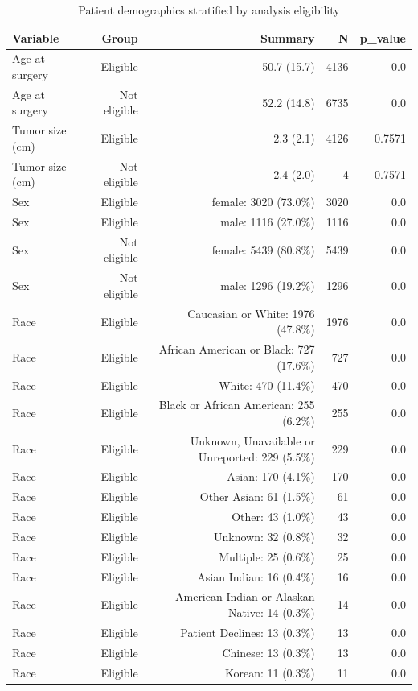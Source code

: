 \begin{table}[htbp]
\centering
\caption{Patient demographics stratified by analysis eligibility}
\label{tab:demographics}
\begin{tabular}{lrrrr}
\toprule
Variable & Group & Summary & N & p\_value \\
\midrule
Age at surgery & Eligible & 50.7 (15.7) & 4136 & 0.0 \\
Age at surgery & Not eligible & 52.2 (14.8) & 6735 & 0.0 \\
Tumor size (cm) & Eligible & 2.3 (2.1) & 4126 & 0.7571 \\
Tumor size (cm) & Not eligible & 2.4 (2.0) & 4 & 0.7571 \\
Sex & Eligible & female: 3020 (73.0\%) & 3020 & 0.0 \\
Sex & Eligible & male: 1116 (27.0\%) & 1116 & 0.0 \\
Sex & Not eligible & female: 5439 (80.8\%) & 5439 & 0.0 \\
Sex & Not eligible & male: 1296 (19.2\%) & 1296 & 0.0 \\
Race & Eligible & Caucasian or White: 1976 (47.8\%) & 1976 & 0.0 \\
Race & Eligible & African American  or Black: 727 (17.6\%) & 727 & 0.0 \\
Race & Eligible & White: 470 (11.4\%) & 470 & 0.0 \\
Race & Eligible & Black or African American: 255 (6.2\%) & 255 & 0.0 \\
Race & Eligible & Unknown, Unavailable or Unreported: 229 (5.5\%) & 229 & 0.0 \\
Race & Eligible & Asian: 170 (4.1\%) & 170 & 0.0 \\
Race & Eligible & Other Asian: 61 (1.5\%) & 61 & 0.0 \\
Race & Eligible & Other: 43 (1.0\%) & 43 & 0.0 \\
Race & Eligible & Unknown: 32 (0.8\%) & 32 & 0.0 \\
Race & Eligible & Multiple: 25 (0.6\%) & 25 & 0.0 \\
Race & Eligible & Asian Indian: 16 (0.4\%) & 16 & 0.0 \\
Race & Eligible & American Indian or Alaskan Native: 14 (0.3\%) & 14 & 0.0 \\
Race & Eligible & Patient Declines: 13 (0.3\%) & 13 & 0.0 \\
Race & Eligible & Chinese: 13 (0.3\%) & 13 & 0.0 \\
Race & Eligible & Korean: 11 (0.3\%) & 11 & 0.0 \\

\end{tabular}
\end{table}
